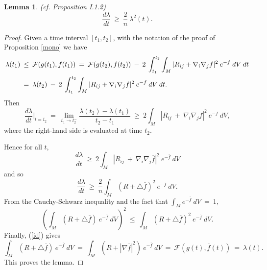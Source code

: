 \documentclass[12pt]{amsart}
\numberwithin{equation}{section}
\theoremstyle{plain}
\newtheorem{lemma}[equation]{Lemma}
\theoremstyle{definition}
\theoremstyle{remark}
\begin{document}
\begin{lemma} (cf. Proposition I.1.2) \label{2/3}
\begin{equation}
\frac{d\lambda}{dt} \: \ge \: \frac{2}{n} \: \lambda^2(t).
\end{equation}
\end{lemma}
\begin{proof}
Given a time interval $[t_1, t_2]$, with the notation of the proof of Proposition \ref{mono} we have
\begin{align}
\lambda(t_1) \: & \le \: {\mathcal F}(g(t_1), f(t_1)) \: = \:
{\mathcal F}(g(t_2), f(t_2)) \: - \: 2 \: \int_{t_1}^{t_2} \int_M |R_{ij} + \nabla_i \nabla_j f|^2 \:
e^{-f} \: dV \: dt \\
& = \: \lambda(t_2)  \: - \: 2 \: \int_{t_1}^{t_2} \int_M |R_{ij} + \nabla_i \nabla_j f|^2 \:
e^{-f} \: dV \: dt. \notag
\end{align}
Then
\begin{equation}
\frac{d\lambda}{dt} \Big|_{t=t_2}
\: = \: \lim_{t_1 \rightarrow t_2^-} \frac{\lambda(t_2) - \lambda(t_1)}{t_2 - t_1} \: \ge \: 
2 \int_M |R_{ij} \: + \: \nabla_i \nabla_j {f}|^2 \: e^{- {f}}
\: dV,
\end{equation}
where the right-hand side is evaluated at time $t_2$.

Hence for all $t$,
\begin{equation} \label{dlambdadt}
\frac{d\lambda}{dt} \: \ge \:
2 \int_M |R_{ij} \: + \: \nabla_i \nabla_j \overline{f}|^2 \: e^{-\overline{f}}
\: dV
\end{equation}
and so
\begin{equation}
\frac{d\lambda}{dt} \: \ge \: \frac{2}{n} \int_M (R + \triangle \overline{f})^2 \: 
e^{- \overline{f}} \: dV.
\end{equation}
From the Cauchy-Schwarz inequality and the fact that 
$\int_M e^{- \overline{f}} \: dV \: = \: 1$, 
\begin{equation}
\left( \int_M (R + \triangle \overline{f}) \: e^{- \overline{f}} \: dV \right)^2 
\: \le \: \int_M (R + \triangle \overline{f})^2 \: 
e^{- \overline{f}} \: dV.
\end{equation}
Finally, (\ref{id}) gives
\begin{equation} \label{using}
\int_M (R + \triangle \overline{f}) \: e^{- \overline{f}} \: dV \: = \:
\int_M (R + | \nabla \overline{f}|^2 ) \: e^{- \overline{f}} \: dV \: = \:
{\mathcal F}(g(t), \overline{f}(t)) \: = \: \lambda(t).
\end{equation}
This proves the lemma.
\end{proof}
\end{document}
